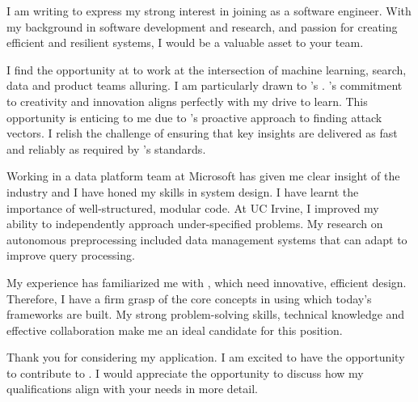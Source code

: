 I am writing to express my strong interest in joining {\fullcompany} as a software engineer. 
With my background in software development and research, and passion for creating efficient and resilient systems, I would be a valuable asset to your team.

I find the opportunity at {\company} to work at the intersection of machine learning, search, data and product teams alluring. 
I am particularly drawn to {\company}'s {\product}. {\company}'s commitment to creativity and innovation aligns perfectly with my drive to learn. 
This opportunity is enticing to me due to {\company}'s proactive approach to finding attack vectors. 
I relish the challenge of ensuring that key insights are delivered as fast and reliably as required by {\company}'s standards. 

Working in a data platform team at Microsoft has given me clear insight of the {\myindustryname} industry and I have honed my skills in system design. 
I have learnt the importance of well-structured, modular code. 
At UC Irvine, I improved my ability to independently approach under-specified problems. 
My research on autonomous preprocessing included data management systems that can adapt to improve query processing. 

My experience has familiarized me with {\myindustryname}, which need innovative, efficient design.
Therefore, I have a firm grasp of the core concepts in {\myindustryname} using which today's frameworks are built.
My strong problem-solving skills, technical knowledge and effective collaboration make me an ideal candidate for this position.

\vspace{3mm}
Thank you for considering my application. I am excited to have the opportunity to contribute to {\company}. I would appreciate the opportunity to discuss how my qualifications align with your needs in more detail. 
